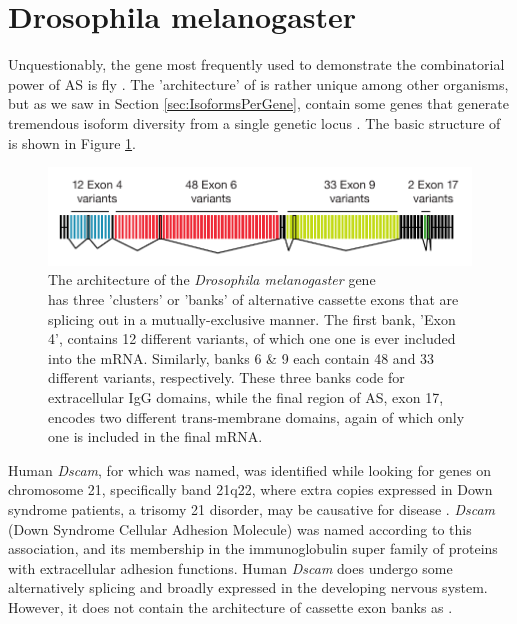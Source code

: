 

\section{Drosophila melanogaster \dscam{}}\label{sec:Dscam}

Unquestionably, the gene most frequently used to demonstrate the combinatorial power of AS is fly \dscam{}. The 'architecture' of \dscam{} is rather unique among other organisms, but as we saw in Section \ref{sec:IsoformsPerGene}, contain some genes that generate tremendous isoform diversity from a single genetic locus \citep{Brown2014}. The basic structure of \dscam{} is shown in Figure \ref{fig:DscamArch}.

\begin{figure}[htbp]
	\centering 
	\includegraphics{Figures/DscamArch.pdf}
	\caption[The architecture of the \textit{Drosophila melanogaster} gene \dscam{}]
	{
		The architecture of the \textit{Drosophila melanogaster} gene \dscam{}\\[0.25cm]
		\dscam{} has three 'clusters' or 'banks' of alternative cassette exons that are splicing out in a mutually-exclusive manner. The first bank, 'Exon 4', contains 12 different variants, of which one one is ever included into the mRNA. Similarly, banks 6 & 9 each contain 48 and 33 different variants, respectively. These three banks code for extracellular IgG domains, while the final region of AS, exon 17, encodes two different trans-membrane domains, again of which only one is included in the final mRNA.
	}
	\label{fig:DscamArch}
\end{figure}

Human \textit{Dscam}, for which \dscam{} was named, was identified while looking for genes on chromosome 21, specifically band 21q22, where extra copies expressed in Down syndrome patients, a trisomy 21 disorder, may be causative for disease \citep{Yamakawa1998b}. \textit{Dscam} (Down Syndrome Cellular Adhesion Molecule) was named according to this association, and its membership in the immunoglobulin super family of proteins with extracellular adhesion functions. Human \textit{Dscam} does undergo some alternatively splicing and broadly expressed in the developing nervous system. However, it does not contain the architecture of cassette exon banks as \dscam{}.

